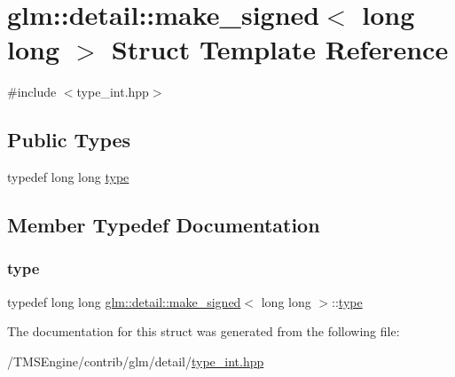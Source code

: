\hypertarget{structglm_1_1detail_1_1make__signed_3_01long_01long_01_4}{}\section{glm\+:\+:detail\+:\+:make\+\_\+signed$<$ long long $>$ Struct Template Reference}
\label{structglm_1_1detail_1_1make__signed_3_01long_01long_01_4}


{\ttfamily \#include $<$type\+\_\+int.\+hpp$>$}

\subsection*{Public Types}
\begin{DoxyCompactItemize}
\item 
typedef long long \hyperlink{structglm_1_1detail_1_1make__signed_3_01long_01long_01_4_a109303fc9f5838a2843711c023a57bc8}{type}
\end{DoxyCompactItemize}


\subsection{Member Typedef Documentation}
\mbox{\label{structglm_1_1detail_1_1make__signed_3_01long_01long_01_4_a109303fc9f5838a2843711c023a57bc8}} 
\subsubsection{\texorpdfstring{type}{type}}
{\footnotesize\ttfamily typedef long long \hyperlink{structglm_1_1detail_1_1make__signed}{glm\+::detail\+::make\+\_\+signed}$<$ long long $>$\+::\hyperlink{structglm_1_1detail_1_1make__signed_3_01long_01long_01_4_a109303fc9f5838a2843711c023a57bc8}{type}}



The documentation for this struct was generated from the following file\+:\begin{DoxyCompactItemize}
\item 
/\+T\+M\+S\+Engine/contrib/glm/detail/\hyperlink{type__int_8hpp}{type\+\_\+int.\+hpp}\end{DoxyCompactItemize}
